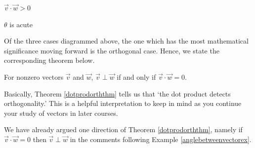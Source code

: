 \documentclass{ximera}
\begin{document}
\begin{center}
\begin{minipage}{0.31\textwidth}
\end{minipage}
\hfill
\begin{minipage}{0.31\textwidth}
\centering
{}

\vspace{0.5em}

$\overrightarrow{v}\cdot\overrightarrow{w}>0$

$\theta$ is acute

\end{minipage}

\end{center}

Of the three cases diagrammed above, the one which has the most mathematical significance moving forward is the orthogonal case.  Hence, we state the corresponding theorem below.

 

\begin{theorem} \label{dotprodorththm}   For nonzero vectors $\overrightarrow{v}$ and $\overrightarrow{w}$,  $\overrightarrow{v} \perp \overrightarrow{w}$ if and only if $\overrightarrow{v} \cdot \overrightarrow{w} = 0$.    

\end{theorem}

 

Basically,  Theorem \ref{dotprodorththm} tells us that  `the dot product detects orthogonality.'  This is a helpful interpretation to keep in mind as you continue your study of vectors in later courses.

 

We have already argued one direction of Theorem \ref{dotprodorththm}, namely if $\overrightarrow{v} \cdot \overrightarrow{w} = 0$ then $\overrightarrow{v} \perp \overrightarrow{w}$ in the comments following Example \ref{anglebetweenvectorex}. 
\end{document}

